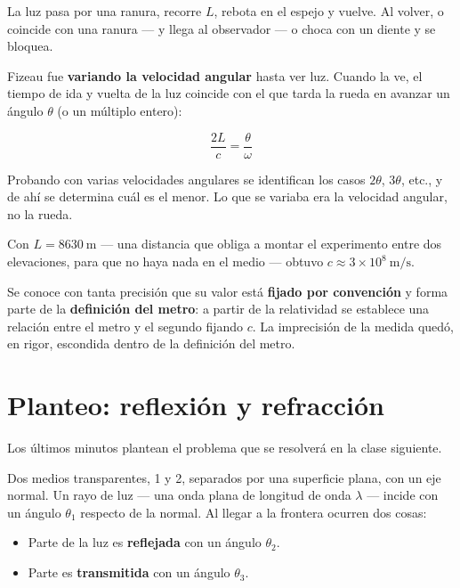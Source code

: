 \documentclass[12pt,a4paper]{article}
\begin{document}
La luz pasa por una ranura, recorre $L$, rebota en el espejo y vuelve. Al volver,
o coincide con una ranura --- y llega al observador --- o choca con un diente y se
bloquea.

Fizeau fue \textbf{variando la velocidad angular} hasta ver luz. Cuando la ve, el
tiempo de ida y vuelta de la luz coincide con el que tarda la rueda en avanzar un
ángulo $\theta$ (o un múltiplo entero):

\begin{keybox}
\[
\boxed{\ \frac{2L}{c} = \frac{\theta}{\omega}\ }
\]
\end{keybox}

\begin{notebox}
Probando con varias velocidades angulares se identifican los casos $2\theta$,
$3\theta$, etc., y de ahí se determina cuál es el menor. Lo que se variaba era la
velocidad angular, no la rueda.
\end{notebox}

Con $L = \SI{8630}{\metre}$ --- una distancia que obliga a montar el experimento
entre dos elevaciones, para que no haya nada en el medio --- obtuvo
$c \approx 3\times 10^{8}\ \si{\metre\per\second}$.

\begin{notebox}
Se conoce con tanta precisión que su valor está \textbf{fijado por convención} y
forma parte de la \textbf{definición del metro}: a partir de la relatividad se
establece una relación entre el metro y el segundo fijando $c$. La imprecisión de
la medida quedó, en rigor, escondida dentro de la definición del metro.
\end{notebox}

\section{Planteo: reflexión y refracción}

Los últimos minutos plantean el problema que se resolverá en la clase siguiente.

Dos medios transparentes, 1 y 2, separados por una superficie plana, con un eje
normal. Un rayo de luz --- una onda plana de longitud de onda $\lambda$ ---
incide con un ángulo $\theta_1$ respecto de la normal. Al llegar a la frontera
ocurren dos cosas:

\begin{itemize}
  \item Parte de la luz es \textbf{reflejada} con un ángulo $\theta_2$.
  \item Parte es \textbf{transmitida} con un ángulo $\theta_3$.
\end{itemize}
\end{document}
